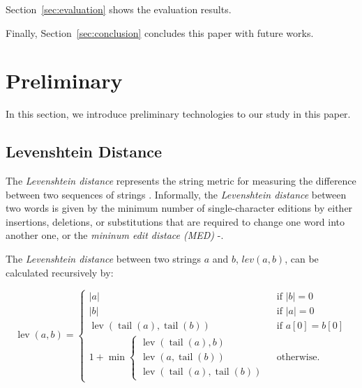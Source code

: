 \documentclass[technicalreport]{ieicej}
\begin{document}
    Section~\ref{sec:evaluation} shows the evaluation results.

    Finally, Section~\ref{sec:conclusion} concludes this paper with future works.

\section{Preliminary}
\label{sec:preliminary}
    In this section, we introduce preliminary technologies to our study in this paper.

    \subsection{Levenshtein Distance}
        The {\em Levenshtein distance} represents the string metric for measuring the difference between two sequences of strings \cite{fuzzywuzzy-guidence}. Informally, the {\em Levenshtein distance} between two words is given by the minimum number of single-character editions by either insertions, deletions, or substitutions that are required to change one word into another one, or the {\em mininum edit distace (MED)} \cite{fuzzywuzzy-guidence}-\cite{levenshtein}.         

        The {\em Levenshtein distance} between two strings $a$ and $b$, $lev(a, b)$, can be calculated recursively by:

        \begin{equation}
                \operatorname{lev}(a, b)=\left\{\begin{array}{ll}
                |a| & \text { if }|b|=0 \\
                |b| & \text { if }|a|=0 \\
                \operatorname{lev}(\operatorname{tail}(a), \operatorname{tail}(b)) & \text { if } a[0]=b[0] \\
                1+\min \left\{\begin{array}{l}
                \operatorname{lev}(\operatorname{tail}(a), b) \\
                \operatorname{lev}(a, \operatorname{tail}(b)) \\
                \operatorname{lev}(\operatorname{tail}(a), \operatorname{tail}(b))
                \end{array}\right. & \text { otherwise. }
                \end{array}\right.
        \end{equation}
\end{document}

